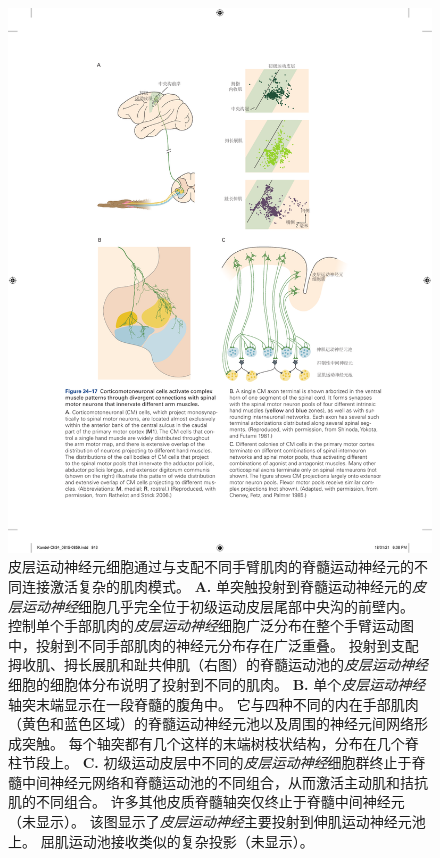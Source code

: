 \begin{figure}[htbp]
	\centering
	\includegraphics[width=1.0\linewidth]{chap34/fig_34_17}
	\caption{皮层运动神经元细胞通过与支配不同手臂肌肉的脊髓运动神经元的不同连接激活复杂的肌肉模式。
		\textbf{A.} 单突触投射到脊髓运动神经元的\textit{皮层运动神经}细胞几乎完全位于初级运动皮层尾部中央沟的前壁内。
		控制单个手部肌肉的\textit{皮层运动神经}细胞广泛分布在整个手臂运动图中，投射到不同手部肌肉的神经元分布存在广泛重叠。
		投射到支配拇收肌、拇长展肌和趾共伸肌（右图）的脊髓运动池的\textit{皮层运动神经}细胞的细胞体分布说明了投射到不同的肌肉\cite{rathelot2006muscle}。
		\textbf{B.} 单个\textit{皮层运动神经}轴突末端显示在一段脊髓的腹角中。
		它与四种不同的内在手部肌肉（黄色和蓝色区域）的脊髓运动神经元池以及周围的神经元间网络形成突触。
		每个轴突都有几个这样的末端树枝状结构，分布在几个脊柱节段上\cite{shinoda1981divergent}。
		\textbf{C.} 初级运动皮层中不同的\textit{皮层运动神经}细胞群终止于脊髓中间神经元网络和脊髓运动池的不同组合，从而激活主动肌和拮抗肌的不同组合。
		许多其他皮质脊髓轴突仅终止于脊髓中间神经元（未显示）。
		该图显示了\textit{皮层运动神经}主要投射到伸肌运动神经元池上。
		屈肌运动池接收类似的复杂投影（未显示）\cite{cheney1985patterns}。}
	\label{fig:34_17}
\end{figure}


